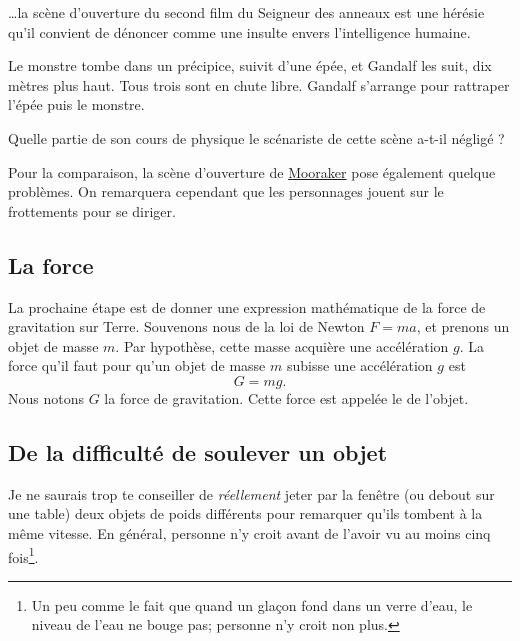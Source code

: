\ldots la scène d'ouverture du second film du Seigneur des anneaux est une hérésie qu'il convient de dénoncer comme une insulte envers l'intelligence humaine.

\begin{exercice}
	Le monstre tombe dans un précipice, suivit d'une épée, et Gandalf les suit, dix mètres plus haut. Tous trois sont en chute libre. Gandalf s'arrange pour rattraper l'épée puis le monstre.

	Quelle partie de son cours de physique le scénariste de cette scène a-t-il négligé ?
\end{exercice}

Pour la comparaison, la scène d'ouverture de \href{http://fr.wikipedia.org/wiki/Moonraker_(film)}{Mooraker} pose également quelque problèmes. On remarquera cependant que les personnages jouent sur le frottements pour se diriger.

\subsection{La force}

La prochaine étape est de donner une expression mathématique de la force de gravitation sur Terre. Souvenons nous de la loi de Newton $F=ma$, et prenons un objet de masse $m$. Par hypothèse, cette masse acquière une accélération $g$. La force qu'il faut pour qu'un objet de masse $m$ subisse une accélération $g$ est
\begin{equation}
	G=mg.
\end{equation}
Nous notons $G$ la force de gravitation. Cette force est appelée le  de l'objet.

\subsection{De la difficulté de soulever un objet}

Je ne saurais trop te conseiller de \emph{réellement} jeter par la fenêtre (ou debout sur une table) deux objets de poids différents pour remarquer qu'ils tombent à la même vitesse. En général, personne n'y croit avant de l'avoir vu au moins cinq fois\footnote{Un peu comme le fait que quand un glaçon fond dans un verre d'eau, le niveau de l'eau ne bouge pas; personne n'y croit non plus.}. 

